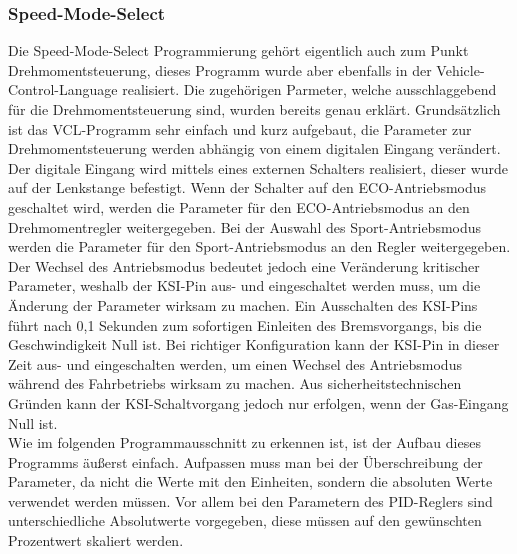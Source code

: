 \subsubsection{Speed-Mode-Select}
Die Speed-Mode-Select Programmierung gehört eigentlich auch zum Punkt Drehmomentsteuerung, dieses Programm wurde aber ebenfalls in der Vehicle-Control-Language realisiert. Die zugehörigen Parmeter, welche ausschlaggebend für die Drehmomentsteuerung sind, wurden bereits genau erklärt. Grundsätzlich ist das VCL-Programm sehr einfach und kurz aufgebaut, die Parameter zur Drehmomentsteuerung werden abhängig von einem digitalen Eingang verändert. Der digitale Eingang wird mittels eines externen Schalters realisiert, dieser wurde auf der Lenkstange befestigt. Wenn der Schalter auf den ECO-Antriebsmodus geschaltet wird, werden die Parameter für den ECO-Antriebsmodus an den Drehmomentregler weitergegeben. Bei der Auswahl des Sport-Antriebsmodus werden die Parameter für den Sport-Antriebsmodus an den Regler weitergegeben. Der Wechsel des Antriebsmodus bedeutet jedoch eine Veränderung kritischer Parameter, weshalb der KSI-Pin aus- und eingeschaltet werden muss, um die Änderung der Parameter wirksam zu machen. Ein Ausschalten des KSI-Pins führt nach 0,1 Sekunden zum sofortigen Einleiten des Bremsvorgangs, bis die Geschwindigkeit Null ist. Bei richtiger Konfiguration kann der KSI-Pin in dieser Zeit aus- und eingeschalten werden, um einen Wechsel des Antriebsmodus während des Fahrbetriebs wirksam zu machen. Aus sicherheitstechnischen Gründen kann der KSI-Schaltvorgang jedoch nur erfolgen, wenn der Gas-Eingang Null ist.\\ 
\vspace{5mm}
Wie im folgenden Programmausschnitt zu erkennen ist, ist der Aufbau dieses Programms äußerst einfach. Aufpassen muss man bei der Überschreibung der Parameter, da nicht die Werte mit den Einheiten, sondern die absoluten Werte verwendet werden müssen. Vor allem bei den Parametern des PID-Reglers sind unterschiedliche Absolutwerte vorgegeben, diese müssen auf den gewünschten Prozentwert skaliert werden.
\vspace{2mm}
